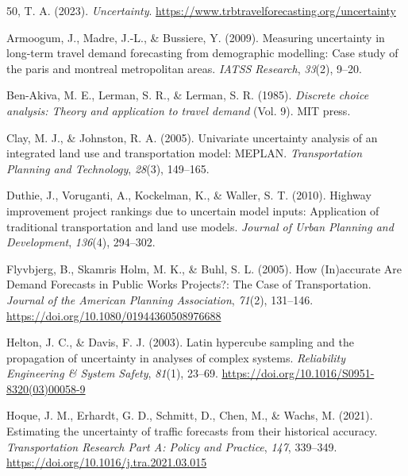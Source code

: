 \documentclass[fancy, masters, twoside]{byuthesis}
\newlength{\cslhangindent}
\newlength{\cslentryspacingunit} %
\newenvironment{CSLReferences}[2] %
 {%
  \setlength{\parindent}{0pt}
  \ifodd #1
  \let\oldpar\par
  \def\par{\hangindent=\cslhangindent\oldpar}
  \fi
  \setlength{\parskip}{#2\cslentryspacingunit}
 }%
 {}
\begin{document}
\pagestyle{myrefs}

\hypertarget{refs}{}
\begin{CSLReferences}{1}{0}
\leavevmode{}%
50, T. A. (2023). \emph{Uncertainty}. \url{https://www.trbtravelforecasting.org/uncertainty}

\leavevmode{}%
Armoogum, J., Madre, J.-L., \& Bussiere, Y. (2009). Measuring uncertainty in long-term travel demand forecasting from demographic modelling: Case study of the paris and montreal metropolitan areas. \emph{IATSS Research}, \emph{33}(2), 9--20.

\leavevmode{}%
Ben-Akiva, M. E., Lerman, S. R., \& Lerman, S. R. (1985). \emph{Discrete choice analysis: Theory and application to travel demand} (Vol. 9). MIT press.

\leavevmode{}%
Clay, M. J., \& Johnston, R. A. (2005). Univariate uncertainty analysis of an integrated land use and transportation model: MEPLAN. \emph{Transportation Planning and Technology}, \emph{28}(3), 149--165.

\leavevmode{}%
Duthie, J., Voruganti, A., Kockelman, K., \& Waller, S. T. (2010). Highway improvement project rankings due to uncertain model inputs: Application of traditional transportation and land use models. \emph{Journal of Urban Planning and Development}, \emph{136}(4), 294--302.

\leavevmode{}%
Flyvbjerg, B., Skamris Holm, M. K., \& Buhl, S. L. (2005). How ({In})accurate {Are Demand Forecasts} in {Public Works Projects}?: {The Case} of {Transportation}. \emph{Journal of the American Planning Association}, \emph{71}(2), 131--146. \url{https://doi.org/10.1080/01944360508976688}

\leavevmode{}%
Helton, J. C., \& Davis, F. J. (2003). Latin hypercube sampling and the propagation of uncertainty in analyses of complex systems. \emph{Reliability Engineering \& System Safety}, \emph{81}(1), 23--69. \url{https://doi.org/10.1016/S0951-8320(03)00058-9}

\leavevmode{}%
Hoque, J. M., Erhardt, G. D., Schmitt, D., Chen, M., \& Wachs, M. (2021). Estimating the uncertainty of traffic forecasts from their historical accuracy. \emph{Transportation Research Part A: Policy and Practice}, \emph{147}, 339--349. \url{https://doi.org/10.1016/j.tra.2021.03.015}


\end{CSLReferences}
\end{document}
